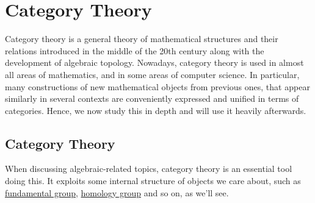 \chapter{Category Theory}
Category theory is a general theory of mathematical structures and their relations introduced in the middle of the 20th century along with the development of algebraic topology. Nowadays, category theory is used in almost all areas of mathematics, and in some areas of computer science. In particular, many constructions of new mathematical objects from previous ones, that appear similarly in several contexts are conveniently expressed and unified in terms of categories. Hence, we now study this in depth and will use it heavily afterwards.

\section{Category Theory}
When discussing algebraic-related topics, category theory is an essential tool doing this. It exploits some internal structure of objects we care about, such as \hyperref[def:fundamental-group]{fundamental group}, \hyperref[def:homology-group]{homology group} and so on, as we'll see.

